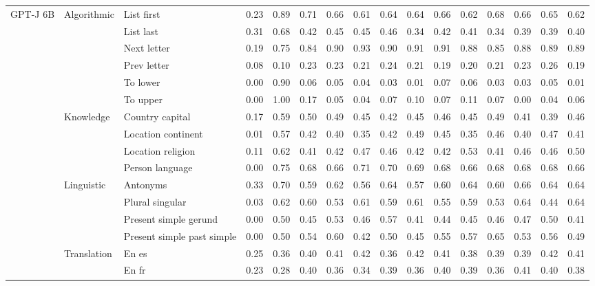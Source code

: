 \begin{center}
\begin{longtable}{lllrrrrrrrrrrrrr}
\multirow[t]{18}{*}{GPT-J 6B} & \multirow[t]{6}{*}{Algorithmic} & List first & 0.23 & 0.89 & 0.71 & 0.66 & 0.61 & 0.64 & 0.64 & 0.66 & 0.62 & 0.68 & 0.66 & 0.65 & 0.62 \\
 &  & List last & 0.31 & 0.68 & 0.42 & 0.45 & 0.45 & 0.46 & 0.34 & 0.42 & 0.41 & 0.34 & 0.39 & 0.39 & 0.40 \\
 &  & Next letter & 0.19 & 0.75 & 0.84 & 0.90 & 0.93 & 0.90 & 0.91 & 0.91 & 0.88 & 0.85 & 0.88 & 0.89 & 0.89 \\
 &  & Prev letter & 0.08 & 0.10 & 0.23 & 0.23 & 0.21 & 0.24 & 0.21 & 0.19 & 0.20 & 0.21 & 0.23 & 0.26 & 0.19 \\
 &  & To lower & 0.00 & 0.90 & 0.06 & 0.05 & 0.04 & 0.03 & 0.01 & 0.07 & 0.06 & 0.03 & 0.03 & 0.05 & 0.01 \\
 &  & To upper & 0.00 & 1.00 & 0.17 & 0.05 & 0.04 & 0.07 & 0.10 & 0.07 & 0.11 & 0.07 & 0.00 & 0.04 & 0.06 \\
\cline{2-16}
 & \multirow[t]{4}{*}{Knowledge} & Country capital & 0.17 & 0.59 & 0.50 & 0.49 & 0.45 & 0.42 & 0.45 & 0.46 & 0.45 & 0.49 & 0.41 & 0.39 & 0.46 \\
 &  & Location continent & 0.01 & 0.57 & 0.42 & 0.40 & 0.35 & 0.42 & 0.49 & 0.45 & 0.35 & 0.46 & 0.40 & 0.47 & 0.41 \\
 &  & Location religion & 0.11 & 0.62 & 0.41 & 0.42 & 0.47 & 0.46 & 0.42 & 0.42 & 0.53 & 0.41 & 0.46 & 0.46 & 0.50 \\
 &  & Person language & 0.00 & 0.75 & 0.68 & 0.66 & 0.71 & 0.70 & 0.69 & 0.68 & 0.66 & 0.68 & 0.68 & 0.68 & 0.66 \\
\cline{2-16}
 & \multirow[t]{4}{*}{Linguistic} & Antonyms & 0.33 & 0.70 & 0.59 & 0.62 & 0.56 & 0.64 & 0.57 & 0.60 & 0.64 & 0.60 & 0.66 & 0.64 & 0.64 \\
 &  & Plural singular & 0.03 & 0.62 & 0.60 & 0.53 & 0.61 & 0.59 & 0.61 & 0.55 & 0.59 & 0.53 & 0.64 & 0.44 & 0.64 \\
 &  & Present simple gerund & 0.00 & 0.50 & 0.45 & 0.53 & 0.46 & 0.57 & 0.41 & 0.44 & 0.45 & 0.46 & 0.47 & 0.50 & 0.41 \\
 &  & Present simple past simple & 0.00 & 0.50 & 0.54 & 0.60 & 0.42 & 0.50 & 0.45 & 0.55 & 0.57 & 0.65 & 0.53 & 0.56 & 0.49 \\
\cline{2-16}
 & \multirow[t]{4}{*}{Translation} & En es & 0.25 & 0.36 & 0.40 & 0.41 & 0.42 & 0.36 & 0.42 & 0.41 & 0.38 & 0.39 & 0.39 & 0.42 & 0.41 \\
 &  & En fr & 0.23 & 0.28 & 0.40 & 0.36 & 0.34 & 0.39 & 0.36 & 0.40 & 0.39 & 0.36 & 0.41 & 0.40 & 0.38 \\

\end{longtable}
\end{center}
